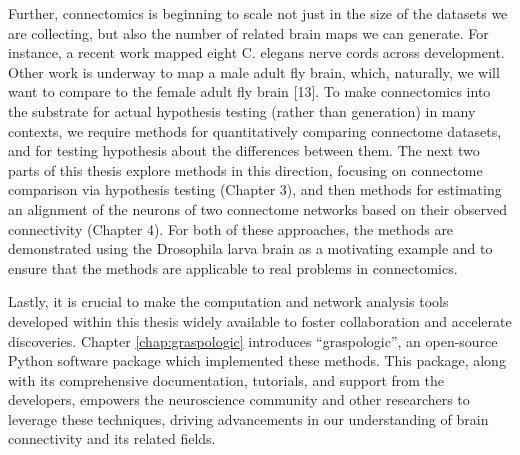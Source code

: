 Further, connectomics is beginning to scale not just in the size of the datasets we are collecting, but also the number of related brain maps we can generate. For instance, a recent work mapped eight C. elegans nerve cords across development. Other work is underway to map a male adult fly brain, which, naturally, we will want to compare to the female adult fly brain [13]. To make connectomics into the substrate for actual
hypothesis testing (rather than generation) in many contexts, we require methods for quantitatively comparing connectome datasets, and for testing hypothesis about the differences between them. The next two parts of this thesis explore methods in this direction, focusing on connectome comparison via hypothesis testing (Chapter 3), and then methods for estimating an alignment of the neurons of two connectome networks based on their observed connectivity (Chapter 4). For both of these approaches, the methods are demonstrated using the Drosophila larva brain as a motivating example and to ensure that the methods are applicable to real problems in connectomics.

Lastly, it is crucial to make the computation and network analysis tools developed within this thesis widely available to foster collaboration and accelerate discoveries. Chapter \ref{chap:graspologic} introduces ``graspologic'', an open-source Python software package which implemented these methods. This package, along with its comprehensive documentation, tutorials, and support from the developers, empowers the neuroscience community and other researchers to leverage these techniques, driving advancements in our understanding of brain connectivity and its related fields.

